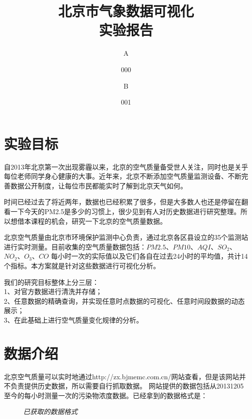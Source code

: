 ﻿\documentclass{article}
\begin{document}
\begin{CJK*}{GBK}{song}
\title{\textbf{北京市气象数据可视化\\实验报告}}
\author{A \and{000}\and{  B}\and{ 001}}
\maketitle

\section{实验目标}
\qquad 自2013年北京第一次出现雾霾以来，北京的空气质量备受世人关注，同时也是关乎每位老师同学身心健康的大事。近年来，北京不断添加空气质量监测设备、不断完善数据公开制度，让每位市民都能实时了解到北京天气如何。

\setlength{\parskip}{10pt}时间已经过去了将近两年，数据也已经积累了很多，但是大多数人也还是停留在翻看一下今天的PM2.5是多少的习惯上，很少见到有人对历史数据进行研究整理。所以想借本课程的机会，研究一下北京的空气质量数据。

北京空气质量由北京市环境保护监测中心负责，通过北京各区县设立的35个监测站进行实时测量。目前收集的空气质量数据包括：$PM2.5$、$PM10$、$AQI$、$SO_2$、$NO_2$、$O_3$、$CO$ 每小时一次的实际值以及它们各自在过去24小时的平均值，共计14个指标。本方案就是针对这些数据进行可视化分析。

我们的研究目标整体上分三层：\\
1、对官方数据进行清洗并存储；\\
2、任意数据的精确查询，并实现任意时点数据的可视化、任意时间段数据的动态展示；\\
3、在此基础上进行空气质量变化规律的分析。

\section{数据介绍}
\qquad 北京空气质量可以实时地通过http://zx.bjmemc.com.cn/网站查看，但是该网站并不负责提供历史数据，所以需要自行抓取数据。
网站提供的数据包括从20131205至今的每小时测量一次的污染物浓度数据。已经拿到的数据格式是：

\begin{figure}[ht]
\centering
{}
\caption{\textit{已获取的数据格式}}
\end{figure}


\end{CJK*}
\end{document}
